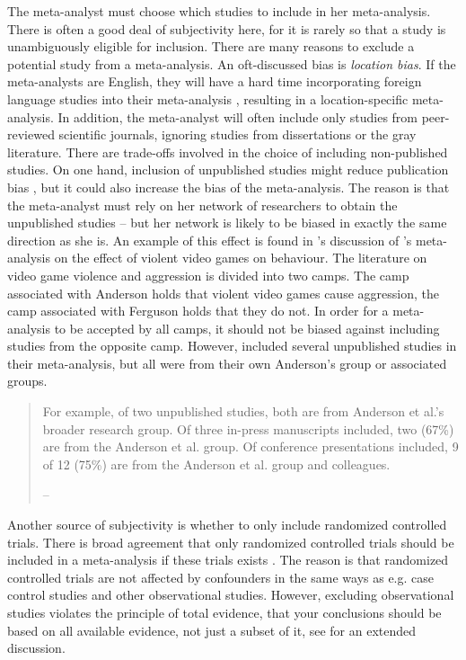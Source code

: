 The meta-analyst must choose which studies to include in her meta-analysis.
There is often a good deal of subjectivity here, for it is rarely
so that a study is unambiguously eligible for inclusion. There are
many reasons to exclude a potential study from a meta-analysis. An
oft-discussed bias is \emph{location bias}. If the meta-analysts
are English, they will have a hard time incorporating foreign language
studies into their meta-analysis \parencite{Egger1998-kj}, resulting
in a location-specific meta-analysis. In addition, the meta-analyst
will often include only studies from peer-reviewed scientific journals,
ignoring studies from dissertations or the gray literature. There
are trade-offs involved in the choice of including non-published studies.
On one hand, inclusion of unpublished studies might reduce publication
bias \parencite{Egger1997-ue},
but it could also increase the bias of the meta-analysis. The reason
is that the meta-analyst must rely on her network of researchers to
obtain the unpublished studies -- but her network is likely to be
biased in exactly the same direction as she is. An example of this
effect is found in \cite{Ferguson2010-to}'s discussion of \cite{Anderson2010-ki}'s
meta-analysis on the effect of violent video games on behaviour. The
literature on video game violence and aggression is divided into two
camps. The camp associated with Anderson holds that violent video
games cause aggression, the camp associated with Ferguson holds that
they do not. In order for a meta-analysis to be accepted by all camps,
it should not be biased against including studies from the opposite
camp. However, \cite{anderson_violent_2010} included several unpublished
studies in their meta-analysis, but all were from their own Anderson's
group or associated groups.
\begin{quote}
For example, of two unpublished studies, both are from Anderson et
al.'s broader research group. Of three in-press manuscripts
included, two (67\%) are from the Anderson et al. group. Of conference
presentations included, 9 of 12 (75\%) are from the Anderson et al.
group and colleagues. 
\begin{flushright}
-- \cite[p. 2]{Ferguson2010-to}
\par\end{flushright}

\end{quote}
Another source of subjectivity is whether to only include randomized
controlled trials. There is broad agreement that only randomized controlled
trials should be included in a meta-analysis if these trials exists
\parencite{Egger1997-ue}. The reason is that randomized
controlled trials are not affected by confounders in the same ways
as e.g. case control studies and other observational studies. However,
excluding observational studies violates the principle of total evidence,
that your conclusions should be based on all available evidence, not
just a subset of it, see \cite{Stegenga2011-zo} for an extended
discussion.

